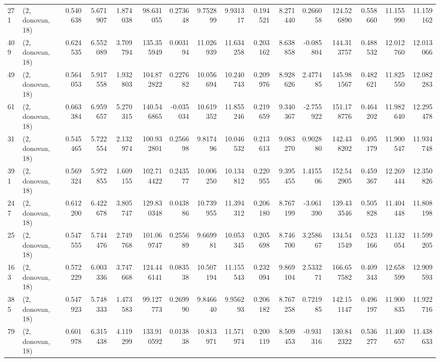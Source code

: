 \begin{tabular}{llrrrrrrrrrrrrrr}
271 &  (2, donovan, 18) &   0.540638 &   5.671907 &   1.874038 &    98.631055 &   0.273648 &   9.752899 &   9.931317 &  0.194521 &   8.271440 &   0.266058 &   124.526890 &  0.558660 &  11.155990 &  11.159162 \\
409 &  (2, donovan, 18) &   0.624535 &   6.552089 &   3.709794 &   135.355949 &   0.003194 &  11.026939 &  11.634258 &  0.203162 &   8.638858 &  -0.085804 &   144.313757 &  0.488532 &  12.012760 &  12.013066 \\
49  &  (2, donovan, 18) &   0.564053 &   5.917558 &   1.932803 &   104.872822 &   0.227682 &  10.056694 &  10.240743 &  0.209976 &   8.928626 &   2.477485 &   145.981567 &  0.482621 &  11.825550 &  12.082283 \\
61  &  (2, donovan, 18) &   0.663384 &   6.959657 &   5.270315 &   140.546865 &  -0.035034 &  10.619352 &  11.855246 &  0.219659 &   9.340367 &  -2.755922 &   151.178776 &  0.464202 &  11.982640 &  12.295478 \\
31  &  (2, donovan, 18) &   0.545465 &   5.722554 &   2.132974 &   100.932801 &   0.256698 &   9.817496 &  10.046532 &  0.213613 &   9.083270 &   0.902880 &   142.438202 &  0.495179 &  11.900547 &  11.934748 \\
391 &  (2, donovan, 18) &   0.569324 &   5.972855 &   1.609155 &   102.714422 &   0.243577 &  10.006250 &  10.134812 &  0.220955 &   9.395455 &   1.415506 &   152.542905 &  0.459367 &  12.269444 &  12.350826 \\
247 &  (2, donovan, 18) &   0.612200 &   6.422678 &   3.805747 &   129.830348 &   0.043886 &  10.739955 &  11.394312 &  0.206180 &   8.767199 &  -3.061390 &   139.433546 &  0.505828 &  11.404448 &  11.808198 \\
25  &  (2, donovan, 18) &   0.547555 &   5.744476 &   2.749768 &   101.069747 &   0.255689 &   9.669981 &  10.053345 &  0.205698 &   8.746700 &   3.258667 &   134.541549 &  0.523166 &  11.132054 &  11.599205 \\
163 &  (2, donovan, 18) &   0.572229 &   6.003336 &   3.747668 &   124.446141 &   0.083538 &  10.507194 &  11.155543 &  0.232094 &   9.869104 &   2.533271 &   166.657582 &  0.409343 &  12.658599 &  12.909593 \\
385 &  (2, donovan, 18) &   0.547923 &   5.748333 &   1.473583 &    99.127773 &   0.269990 &   9.846640 &   9.956293 &  0.206182 &   8.767258 &   0.721985 &   142.151147 &  0.496197 &  11.900835 &  11.922716 \\
79  &  (2, donovan, 18) &   0.601978 &   6.315438 &   4.119299 &   133.910592 &   0.013838 &  10.813971 &  11.571974 &  0.200119 &   8.509453 &  -0.931316 &   130.842322 &  0.536277 &  11.400657 &  11.438633 \\

\end{tabular}
